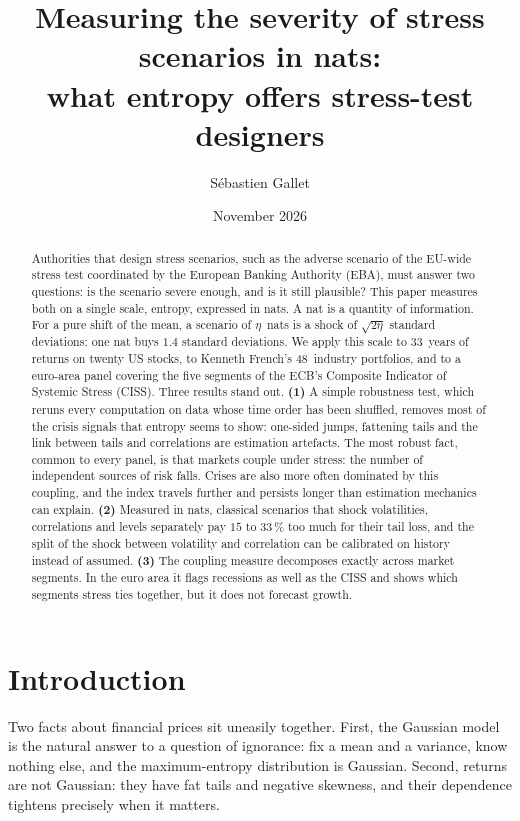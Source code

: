 \documentclass[11pt]{article}
\title{Measuring the severity of stress scenarios in nats:\\
what entropy offers stress-test designers}
\author{Sébastien Gallet}
\date{November 2026}
\theoremstyle{definition}
\begin{document}
\maketitle

\begin{abstract}
\noindent Authorities that design stress scenarios, such as the adverse
scenario of the EU-wide stress test coordinated by the European Banking
Authority (EBA), must answer two questions: is the scenario severe enough, and
is it still plausible? This paper measures both on a single scale, entropy,
expressed in nats. A nat is a quantity of information. For a pure shift of the
mean, a scenario of $\eta$~nats is a shock of $\sqrt{2\eta}$ standard
deviations: one nat buys $1.4$ standard deviations. We apply this scale to
33~years of returns on twenty US stocks, to Kenneth French's 48~industry
portfolios, and to a euro-area panel covering the five segments of the ECB's
Composite Indicator of Systemic Stress (CISS). Three results stand out.
\textbf{(1)} A simple robustness test, which reruns every computation on data
whose time order has been shuffled, removes most of the crisis signals that
entropy seems to show: one-sided jumps, fattening tails and the link between
tails and correlations are estimation artefacts. The most robust fact, common
to every panel, is that markets couple under stress: the number of independent
sources of risk falls. Crises are also more often dominated by this coupling,
and the index travels further and persists longer than estimation mechanics
can explain. \textbf{(2)} Measured in nats, classical scenarios that shock
volatilities, correlations and levels separately pay $15$ to $33\,\%$ too much
for their tail loss, and the split of the shock between volatility and
correlation can be calibrated on history instead of assumed. \textbf{(3)} The
coupling measure decomposes exactly across market segments. In the euro area
it flags recessions as well as the CISS and shows which segments stress ties
together, but it does not forecast growth.
\end{abstract}


\section{Introduction}
\label{sec:intro}

Two facts about financial prices sit uneasily together. First, the Gaussian
model is the natural answer to a question of ignorance: fix a mean and a
variance, know nothing else, and the maximum-entropy distribution is Gaussian.
Second, returns are not Gaussian: they have fat tails and negative skewness,
and their dependence tightens precisely when it matters.
\end{document}
